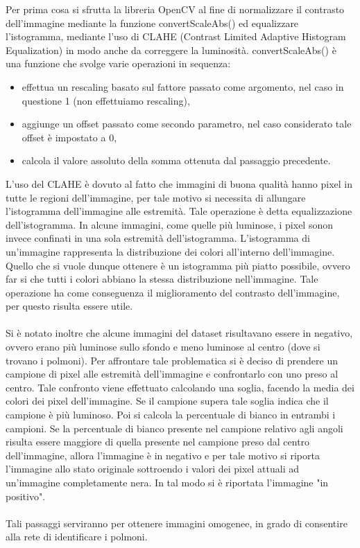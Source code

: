 Per prima cosa si sfrutta la libreria OpenCV \cite{ocv} al fine di normalizzare il contrasto dell'immagine mediante la funzione convertScaleAbs() ed 
equalizzare l'istogramma, mediante l'uso di CLAHE (Contrast Limited Adaptive Histogram Equalization) in modo anche da correggere la luminosità.
convertScaleAbs() è una funzione che svolge varie operazioni in sequenza:
\begin{itemize}
    \item effettua un rescaling basato sul fattore passato come argomento, nel caso in questione 1 (non effettuiamo rescaling),
    \item aggiunge un offset passato come secondo parametro, nel caso considerato tale offset è impostato a 0,
    \item calcola il valore assoluto della somma ottenuta dal passaggio precedente.
\end{itemize}
L'uso del CLAHE è dovuto al fatto che immagini di buona qualità hanno pixel in tutte le regioni dell'immagine, per tale motivo si necessita di 
allungare l'istogramma dell'immagine alle estremità. Tale operazione è detta equalizzazione dell'istogramma. In alcune immagini, come quelle più luminose, 
i pixel sonon invece confinati in una sola estremità dell'istogramma. L'istogramma di un'immagine rappresenta la distribuzione dei colori all'interno dell'immagine.
Quello che si vuole dunque ottenere è un istogramma più piatto possibile, ovvero far si che tutti i colori abbiano la stessa distribuzione nell'immagine.
Tale operazione ha come conseguenza il miglioramento del contrasto dell'immagine, per questo risulta essere utile.
\\\\
Si è notato inoltre che alcune immagini del dataset risultavano essere in negativo, ovvero erano più luminose sullo sfondo e meno luminose al centro (dove si trovano i polmoni).
Per affrontare tale problematica si è deciso di prendere un campione di pixel alle estremità dell'immagine e confrontarlo con uno preso al centro.
Tale confronto viene effettuato calcolando una soglia, facendo la media dei colori dei pixel dell'immagine.
Se il campione supera tale soglia indica che il campione è più luminoso. Poi si calcola la percentuale di bianco in entrambi i campioni. 
Se la percentuale di bianco presente nel campione relativo agli angoli risulta essere maggiore di quella presente nel campione preso dal centro dell'immagine, allora 
l'immagine è in negativo e per tale motivo si riporta l'immagine allo stato originale sottroendo  i valori dei pixel attuali ad un'immagine completamente nera.
In tal modo si è riportata l'immagine "in positivo".
\\\\
Tali passaggi serviranno per ottenere immagini omogenee, in grado di consentire alla rete di identificare i polmoni.
